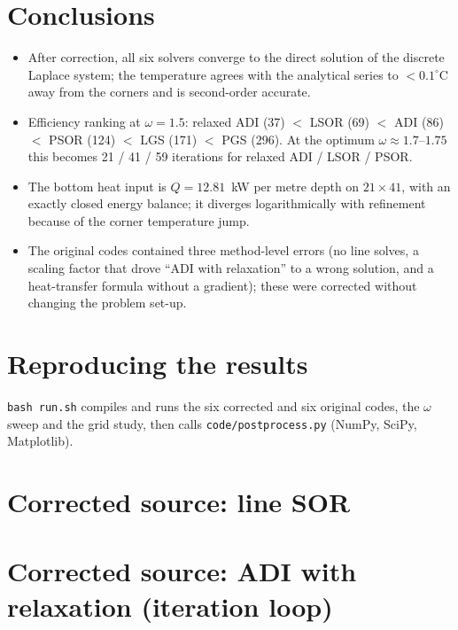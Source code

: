 \section{Conclusions}
\begin{itemize}
\item After correction, all six solvers converge to the direct solution of the discrete Laplace system; the temperature agrees with the analytical series to $<0.1^\circ$C away from the corners and is second-order accurate.
\item Efficiency ranking at $\omega=1.5$: relaxed ADI (37) $<$ LSOR (69) $<$ ADI (86) $<$ PSOR (124) $<$ LGS (171) $<$ PGS (296). At the optimum $\omega\approx1.7$--$1.75$ this becomes 21 / 41 / 59 iterations for relaxed ADI / LSOR / PSOR.
\item The bottom heat input is $Q=12.81$~kW per metre depth on $21\times41$, with an exactly closed energy balance; it diverges logarithmically with refinement because of the corner temperature jump.
\item The original codes contained three method-level errors (no line solves, a scaling factor that drove ``ADI with relaxation'' to a wrong solution, and a heat-transfer formula without a gradient); these were corrected without changing the problem set-up.
\end{itemize}

\section*{Reproducing the results}
\texttt{bash run.sh} compiles and runs the six corrected and six original codes, the $\omega$ sweep and the grid study, then calls \texttt{code/postprocess.py} (NumPy, SciPy, Matplotlib).

\appendix\section{Corrected source: line SOR}

\section{Corrected source: ADI with relaxation (iteration loop)}


